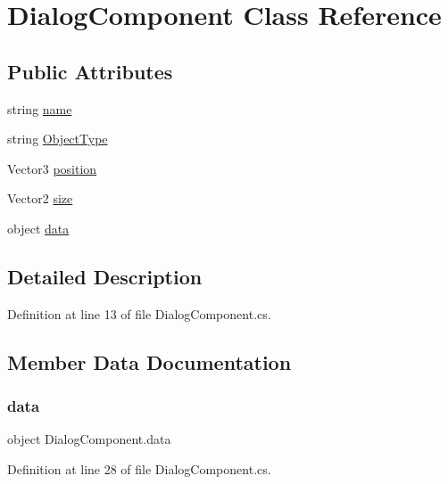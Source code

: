 \hypertarget{class_dialog_component}{}\section{Dialog\+Component Class Reference}
\label{class_dialog_component}
\subsection*{Public Attributes}
\begin{DoxyCompactItemize}
\item 
string \hyperlink{class_dialog_component_aba0c95267ccf7bbf7ae26485b2552a2d}{name}
\item 
string \hyperlink{class_dialog_component_ac05a90fd66f19414b616542941e2044a}{Object\+Type}
\item 
Vector3 \hyperlink{class_dialog_component_a4f51ea11fb406a88d1127938c998beee}{position}
\item 
Vector2 \hyperlink{class_dialog_component_a70a1006f902d2d3ec18d40f0a84b57e2}{size}
\item 
object \hyperlink{class_dialog_component_a9cdfb71015c43770cb2a16fd01c44c6c}{data}
\end{DoxyCompactItemize}


\subsection{Detailed Description}


Definition at line 13 of file Dialog\+Component.\+cs.



\subsection{Member Data Documentation}
\mbox{\label{class_dialog_component_a9cdfb71015c43770cb2a16fd01c44c6c}} 
\subsubsection{\texorpdfstring{data}{data}}
{\footnotesize\ttfamily object Dialog\+Component.\+data}



Definition at line 28 of file Dialog\+Component.\+cs.

